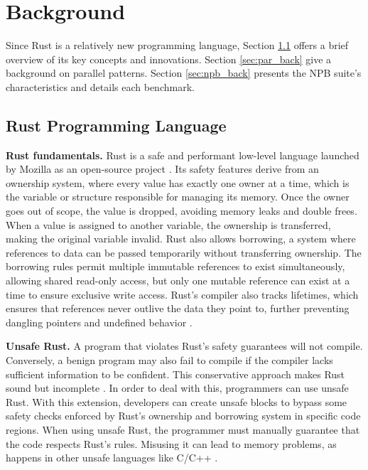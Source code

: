 
\section{Background}\label{sec:back}
Since Rust is a relatively new programming language, Section \ref{sec:rust_back} offers a brief overview of its key concepts and innovations. 
Section \ref{sec:par_back} give a background on parallel patterns. 
Section \ref{sec:npb_back} presents the NPB suite's characteristics and details each benchmark.
    
    \subsection{Rust Programming Language}\label{sec:rust_back}
    \textbf{Rust fundamentals.} Rust is a safe and performant low-level language launched by Mozilla as an open-source project \cite{rustbook}. Its safety features derive from an ownership system, where every value has exactly one owner at a time, which is the variable or structure responsible for managing its memory. Once the owner goes out of scope, the value is dropped, avoiding memory leaks and double frees. When a value is assigned to another variable, the ownership is transferred, making the original variable invalid. Rust also allows borrowing, a system where references to data can be passed temporarily without transferring ownership. The borrowing rules permit multiple immutable references to exist simultaneously, allowing shared read-only access, but only one mutable reference can exist at a time to ensure exclusive write access. Rust’s compiler also tracks lifetimes, which ensures that references never outlive the data they point to, further preventing dangling pointers and undefined behavior \cite{rustbook}.
    
    \textbf{Unsafe Rust.}  A program that violates Rust's safety guarantees will not compile. Conversely, a benign program may also fail to compile if the compiler lacks sufficient information to be confident. This conservative approach makes Rust sound but incomplete \cite{rivera2021keeping}. In order to deal with this, programmers can use unsafe Rust. With this extension, developers can create unsafe blocks to bypass some safety checks enforced by Rust's ownership and borrowing system in specific code regions. When using unsafe Rust, the programmer must manually guarantee that the code respects Rust's rules. Misusing it can lead to memory problems, as happens in other unsafe languages like C/C++ \cite{rustbook}.

